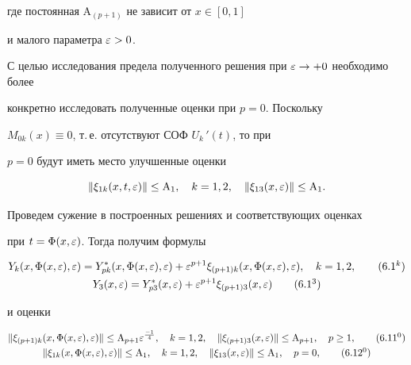 где постоянная $\mathrm {A}_{(p +1)} $ не зависит от $ x \in [0,1]$


и малого параметра $\varepsilon > 0$.





С целью исследования предела полученного решения при $ \e


\rightarrow +0$ необходимо более


конкретно исследовать полученные оценки при $ p = 0$. Поскольку


$M_{0k} (x) \equiv 0$, т.\,е. отсутствуют СОФ $U_k \,' (t)$, то при


$ p = 0$ будут иметь место улучшенные оценки


\begin{equation}


\| \xi_{1k} (x, t, \e) \| \leq \mathrm{A}_{1}, \quad k =1,2,


\quad \| \xi_{13} (x, \e) \| \leq \mathrm{A}_{1}. 


\end{equation}





Проведем сужение в построенных решениях и соответствующих оценках


при $ t = \Phi (x, \varepsilon)$. Тогда получим формулы


\begin{gather}


Y_k (x, \Phi(x, \e), \e) = Y_{pk}^* (x, \Phi(x, \e), \e) +


\e^{p+1} \xi_{(p+1)k} (x, \Phi(x, \e), \e), \quad k =1,2,


\tag{$6.1^k$} \\


%


Y_3 (x, \e) = Y_{p3}^* (x, \e) + \e^{p+1} \xi_{(p+1)3} (x, \e)


\tag{$6.1^3$}


\end{gather}


и оценки


\begin{gather}


\| \xi_{(p+1)k} (x, \Phi(x, \e), \e) \|


\leq \mathrm{A}_{p+1} \e^{\frac{-1}{4}},


\quad k = 1, 2, \quad \| \xi_{(p+1)3} (x, \e) \| \leq \mathrm{A}_{p +1},


\quad p \geq 1, \tag{$6.11^0$} \\


%


\| \xi_{1k} (x,\Phi (x, \e), \e) \| \leq \mathrm{A}_1, \quad k


=1,2,\quad


\| \xi_{13} (x, \e) \| \leq \mathrm{A}_1,


\quad p =0, \tag{$6.12^0$}


\end{gather}


